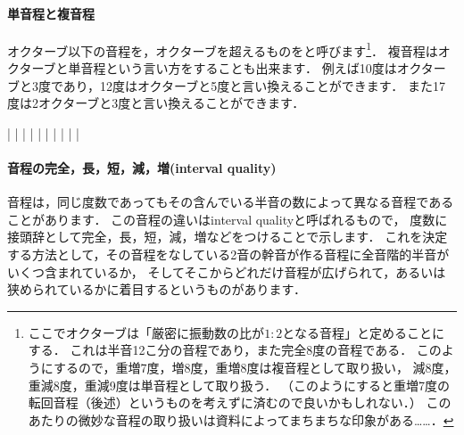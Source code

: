 \documentclass[dvipdfmx,uplatex,b5paper,openany,jbase=12Q,nomag*,textwidth-limit=44%
               ]{gachimuchi}[2020/05/05]
\begin{document}
\paragraph{単音程と複音程}
オクターブ以下の音程を，オクターブを超えるものをと呼びます\footnote{%
  ここでオクターブは「厳密に振動数の比が$1:2$となる音程」と定めることにする．
  これは半音12こ分の音程であり，また完全8度の音程である．
  このようにするので，重増7度，増8度，重増8度は複音程として取り扱い，
  減8度，重減8度，重減9度は単音程として取り扱う．
  （このようにすると重増7度の転回音程（後述）というものを考えずに済むので良いかもしれない．）
  このあたりの微妙な音程の取り扱いは資料によってまちまちな印象がある……．
}．
複音程はオクターブと単音程という言い方をすることも出来ます．
例えば10度はオクターブと3度であり，12度はオクターブと5度と言い換えることができます．
また17度は2オクターブと3度と言い換えることができます．
\begin{Music}
  \Startpiece%
  \Notes|%
  \tinynotesize
  \en\NOtes
  |%
  \en\bar%
  \znotes|\en%
  \Notes%
  \tinynotesize
  \en\Notes%
  \tinynotesize
  |\tinynotesize
  \en\NOtes
  |%
  \en\bar%
  \znotes|\en%
  \Notes%
  \tinynotesize
  \en\Notes%
  \tinynotesize
  |\tinynotesize
  \en\NOtes
  |%
  \en%
  \endpiece%
\end{Music}


\paragraph{音程の完全，長，短，減，増(interval quality)}
音程は，同じ度数であってもその含んでいる半音の数によって異なる音程であることがあります．
この音程の違いはinterval qualityと呼ばれるもので，
度数に接頭辞として完全，長，短，減，増などをつけることで示します．
これを決定する方法として，その音程をなしている2音の幹音が作る音程に全音階的半音がいくつ含まれているか，
そしてそこからどれだけ音程が広げられて，あるいは狭められているかに着目するというものがあります．
\end{document}
